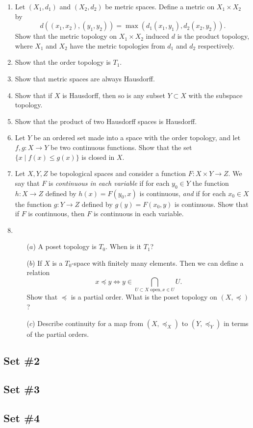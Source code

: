 \begin{enumerate}
  	\item Let $(X_1,d_1)$ and $(X_2,d_2)$ be metric spaces. Define a metric on $X_1 \times X_2$ by
	  \[
	    d((x_1,x_2),(y_1,y_2)) = \max(d_1(x_1,y_1),d_2(x_2,y_2)).
	  \]
    Show that the metric topology on $X_1 \times X_2$ induced $d$ is the product topology, where $X_1$ and $X_2$ have the metric topologies from $d_1$ and $d_2$ respectively.
  
  \item Show that the order topology is $T_1$.
  
  \item \label{metric-Hausdorff} Show that metric spaces are always Hausdorff.
  
  \item Show that if $X$ is Hausdorff, then so is any subset $Y\subset X$ with the subspace topology.
  
  \item Show that the product of two Hausdorff spaces is Hausdorff.
  
  \item Let $Y$ be an ordered set made into a space with the order topology, and let $f,g:X\to Y$ be two continuous functions. Show that the set $\{x \mid f(x)\leq g(x)\}$ is closed in $X$.
  
  \item Let $X,Y,Z$ be topological spaces and consider a function $F:X\times Y\rightarrow Z$. We say that $F$ is \emph{continuous in each variable} if for each $y_0\in Y$ the function $h:X\rightarrow Z$ defined by $h(x)=F(y_0,x)$ is continuous, \emph{and} if for each $x_0\in X$ the function $g:Y\rightarrow Z$ defined by $g(y) = F(x_0,y)$ is continuous. Show that if $F$ is continuous, then $F$ is continuous in each variable.
  
  \item \begin{itemize}
		\item[($a$)] A poset topology is $T_0$. When is it $T_1$?
		\item[($b$)] If $X$ is a $T_0$-space with finitely many elements. Then we can define a relation
		\[x\preceq y \Leftrightarrow y\in \bigcap_{U\subset X\text{ open}, x\in U} U.\]
		Show that $\preceq$ is a partial order. What is the poset topology on $(X,\preceq)$?
		\item[($c$)] Describe continuity for a map from $(X,\preceq_X)$ to $(Y,\preceq_Y)$ in terms of the partial orders.
	\end{itemize}
  
\end{enumerate}

\subsection{Set \#2}

\subsection{Set \#3}

\subsection{Set \#4}
